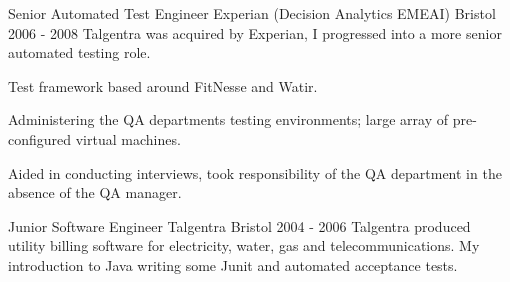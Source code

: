 \begin{cventries}
  \cventrypara
    {Senior Automated Test Engineer} %
    {Experian (Decision Analytics EMEAI)} %
    {Bristol} %
    {2006  - 2008} %
    {Talgentra was acquired by Experian, I progressed into a more senior automated testing role.}
    {
      \begin{cvitems} %
        \item {Test framework based around FitNesse and Watir. }
        \item {Administering the QA departments testing environments; large array of pre-configured virtual machines.}
        \item {Aided in conducting interviews, took responsibility of the QA department in the absence of the QA manager.}
      \end{cvitems}
    }

  \cventry
    {Junior Software Engineer } %
    {Talgentra} %
    {Bristol} %
    {2004 - 2006} %
    {Talgentra produced utility billing software for electricity, water, gas and telecommunications. My introduction to Java writing some Junit and automated acceptance tests.
    }
\end{cventries}
